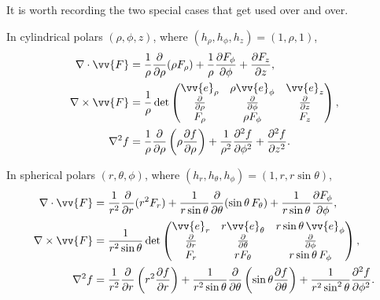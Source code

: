 It is worth recording the two special cases that get used over and over.

\begin{example}
	In cylindrical polars $(\rho, \phi, z)$, where $(h_\rho, h_\phi, h_z) = (1, \rho, 1)$,
	\begin{align*}
		\nabla \cdot \vv{F} &= \frac{1}{\rho} \frac{\partial}{\partial \rho}(\rho F_\rho) + \frac{1}{\rho}\frac{\partial F_\phi}{\partial \phi} + \frac{\partial F_z}{\partial z}, \\
		\nabla \times \vv{F} &= \frac{1}{\rho} \det \begin{pmatrix}
			\vv{e}_\rho & \rho \vv{e}_\phi & \vv{e}_z \\
			\frac{\partial}{\partial \rho} & \frac{\partial}{\partial \phi} & \frac{\partial}{\partial z} \\
			F_\rho & \rho F_\phi & F_z
		\end{pmatrix}, \\
		\nabla^2 f &= \frac{1}{\rho}\frac{\partial}{\partial \rho}\left(\rho \frac{\partial f}{\partial \rho}\right) + \frac{1}{\rho^2}\frac{\partial^2 f}{\partial \phi^2} + \frac{\partial^2 f}{\partial z^2}.
	\end{align*}
\end{example}

\begin{example}
	In spherical polars $(r, \theta, \phi)$, where $(h_r, h_\theta, h_\phi) = (1, r, r \sin \theta)$,
	\begin{align*}
		\nabla \cdot \vv{F} &= \frac{1}{r^2} \frac{\partial}{\partial r}(r^2 F_r) + \frac{1}{r \sin \theta} \frac{\partial}{\partial \theta}(\sin \theta \, F_\theta) + \frac{1}{r \sin \theta} \frac{\partial F_\phi}{\partial \phi}, \\
		\nabla \times \vv{F} &= \frac{1}{r^2 \sin \theta} \det \begin{pmatrix}
			\vv{e}_r & r \vv{e}_\theta & r \sin \theta \, \vv{e}_\phi \\
			\frac{\partial}{\partial r} & \frac{\partial}{\partial \theta} & \frac{\partial}{\partial \phi} \\
			F_r & r F_\theta & r \sin \theta \, F_\phi
		\end{pmatrix}, \\
		\nabla^2 f &= \frac{1}{r^2}\frac{\partial}{\partial r}\left(r^2 \frac{\partial f}{\partial r}\right) + \frac{1}{r^2 \sin \theta} \frac{\partial}{\partial \theta}\left(\sin \theta \frac{\partial f}{\partial \theta}\right) + \frac{1}{r^2 \sin^2\theta} \frac{\partial^2 f}{\partial \phi^2}.
	\end{align*}
\end{example}


